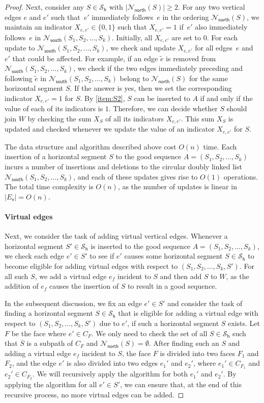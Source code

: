 \documentclass{theoretics}
\newcommand{\EV}{E_\mathsf{v}}
\newcommand{\PH}{\mathcal{S}_\mathsf{h}}
\newcommand{\Nnorth}{\mathcal{N}_\mathsf{north}}
\newcommand{\Nsouth}{\mathcal{N}_\mathsf{south}}
\begin{document}
\begin{proof}
 Next, consider any $S \in \PH$ with $|\Nnorth(S)| \geq 2$. For any two vertical edges $e$ and $e'$ such that~$e'$ immediately follows~$e$ in the ordering $\Nnorth(S)$, we maintain an indicator $X_{e, e'} \in \{0,1\}$ such that $X_{e, e'} = 1$ if~$e'$ also immediately follows~$e$ in $\Nsouth(S_1, S_2, \ldots, S_{k})$. Initially, all $X_{e, e'}$ are set to $0$. For each update to $\Nsouth(S_1, S_2, \ldots, S_{k})$, we check and update $X_{e, e'}$ for all edges~$e$ and~$e'$ that could be affected. For example, if an edge $\tilde{e}$ is removed from $\Nsouth(S_1, S_2, \ldots, S_{k})$, we check if the two edges  immediately preceding and following $\tilde{e}$ in $\Nsouth(S_1, S_2, \ldots, S_{k})$ belong to $\Nnorth(S)$ for the same horizontal segment $S$. If the answer is yes, then we set the corresponding indicator $X_{e, e'}=1$ for $S$. 
 By \ref{item:S2}, $S$ can be inserted to $A$ if and only if the value of each of its indicators is $1$.
 Therefore, we can decide whether $S$ should join $W$ by checking the sum $X_S$ of all its indicators $X_{e, e'}$. This sum $X_S$ is updated and checked whenever we update the value of an indicator $X_{e, e'}$ for $S$.
 
 The data structure and algorithm described above cost $O(n)$ time. Each insertion of a horizontal segment $S$ to the good sequence $A=(S_1, S_2, \ldots, S_k)$ incurs a number of insertions and deletions to the circular doubly linked list $\Nsouth(S_1, S_2, \ldots, S_{k})$, and each of these updates gives rise to $O(1)$  operations. The total time complexity is $O(n)$, as the number of updates is linear in $|\EV|=O(n)$.
 
 \paragraph{Virtual edges}
 Next, we consider the task of adding virtual vertical edges. Whenever a horizontal segment $S' \in \PH$ is inserted to the good sequence $A=(S_1, S_2, \ldots, S_k)$, we check each edge $e' \in S'$ to see if $e'$ causes some horizontal segment $S \in \PH$ to become eligible for adding virtual edges with respect to $(S_1, S_2, \ldots, S_k, S')$. For all such $S$, we add a virtual edge $e_f$ incident to $S$ and then add $S$ to $W$, as the addition of $e_f$ causes the insertion of $S$ to result in a good sequence.
 
 In the subsequent discussion, we fix an edge $e' \in S'$ and consider the task of finding a horizontal segment $S \in \PH$ that is eligible for adding a virtual edge with respect to $(S_1, S_2, \ldots, S_k, S')$ due to $e'$, if such a horizontal segment $S$ exists. Let $F$ be the face where $e' \in C_F$. We only need to check the set of all $S \in \PH$ such that $\overline{S}$ is a subpath of $C_F$ and $\Nnorth(S) = \emptyset$. After finding such an $S$ and adding a virtual edge $e_f$ incident to $S$, the face $F$ is divided into two faces $F_1$ and $F_2$, and the edge $e'$ is also divided into two edges $e_1'$ and $e_2'$, where $e_1' \in C_{F_1}$ and $e_2' \in C_{F_2}$. We will recursively apply the algorithm for both $e_1'$ and $e_2'$. By applying the algorithm for all $e' \in S'$, we can ensure that, at the end of this recursive process, no more virtual edges can be added. 
 

\end{proof}
\end{document}
